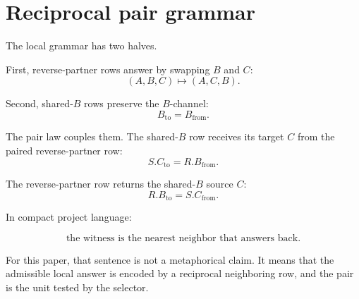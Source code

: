 \section{Reciprocal pair grammar}

The local grammar has two halves.

First, reverse-partner rows answer by swapping \(B\) and \(C\):
\[
(A,B,C)\mapsto(A,C,B).
\]

Second, shared-\(B\) rows preserve the \(B\)-channel:
\[
B_{\mathrm{to}}=B_{\mathrm{from}}.
\]

The pair law couples them. The shared-\(B\) row receives its target \(C\) from the paired reverse-partner row:
\[
S.C_{\mathrm{to}}=R.B_{\mathrm{from}}.
\]

The reverse-partner row returns the shared-\(B\) source \(C\):
\[
R.B_{\mathrm{to}}=S.C_{\mathrm{from}}.
\]

In compact project language:

\[
\text{the witness is the nearest neighbor that answers back.}
\]

For this paper, that sentence is not a metaphorical claim. It means that the admissible local answer is encoded by a reciprocal neighboring row, and the pair is the unit tested by the selector.
